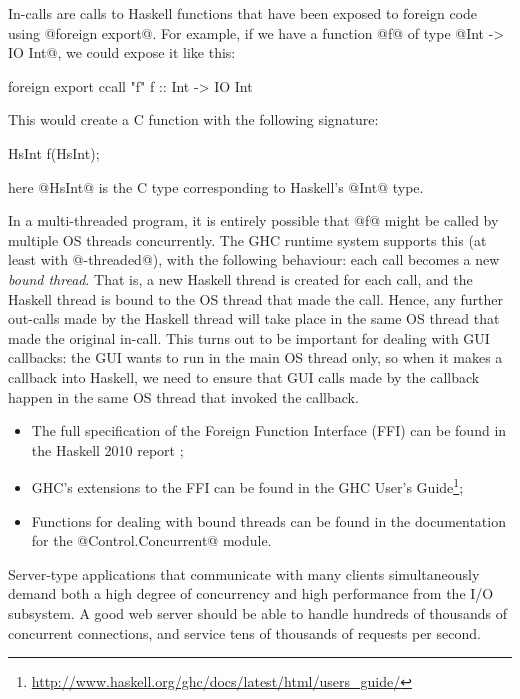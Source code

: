 In-calls are calls to Haskell functions that have been exposed to
foreign code using @foreign export@.  For example, if we have a
function @f@ of type @Int -> IO Int@, we could expose it like this:

\begin{haskell}
foreign export ccall "f" f :: Int -> IO Int
\end{haskell}

\noindent This would create a C function with the following signature:

\begin{haskell}
HsInt f(HsInt);
\end{haskell}

\noindent here @HsInt@ is the C type corresponding to Haskell's @Int@
type.

In a multi-threaded program, it is entirely possible that @f@ might be
called by multiple OS threads concurrently.  The GHC runtime system
supports this (at least with @-threaded@), with the following
behaviour: each call becomes a new \emph{bound thread}.  That is, a
new Haskell thread is created for each call, and the Haskell thread is
bound to the OS thread that made the call.  Hence, any further
out-calls made by the Haskell thread will take place in the same OS
thread that made the original in-call.  This turns out to be important
for dealing with GUI callbacks: the GUI wants to run in the main OS
thread only, so when it makes a callback into Haskell, we need to
ensure that GUI calls made by the callback happen in the same OS
thread that invoked the callback.


\begin{itemize}
\item The full specification of the Foreign Function Interface (FFI)
  can be found in the Haskell 2010 report \cite{haskell2010};
\item GHC's extensions to the FFI can be found in the GHC User's
  Guide\footnote{\url{http://www.haskell.org/ghc/docs/latest/html/users_guide/}};
\item Functions for dealing with bound threads can be found in the
  documentation for the @Control.Concurrent@ module.
\end{itemize}


Server-type applications that communicate with many clients
simultaneously demand both a high degree of concurrency and high
performance from the I/O subsystem.  A good web server should be able
to handle hundreds of thousands of concurrent connections, and service
tens of thousands of requests per second.

